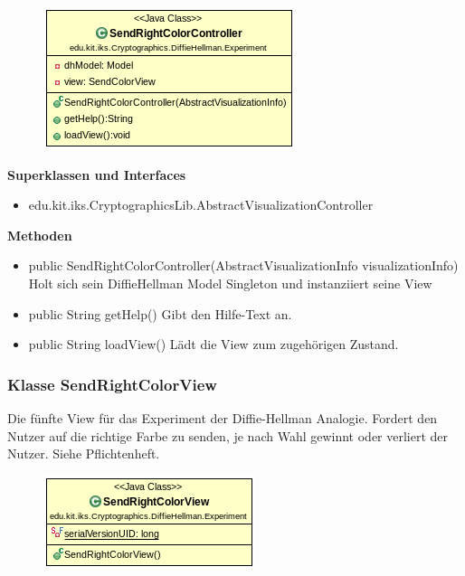 \documentclass{article}
\begin{document}
      \begin{figure}[H]
        \centering
        \includegraphics{resources/edu-kit-iks-Cryptographics-DiffieHellman-Experiment-SendRightColorController}
      \end{figure}

      \textbf{Superklassen und Interfaces}
      \begin{itemize}
        \item edu.kit.iks.CryptographicsLib.AbstractVisualizationController
      \end{itemize}

      \textbf{Methoden}
      \begin{itemize}
          \item public SendRightColorController(AbstractVisualizationInfo visualizationInfo) \newline
              Holt sich sein DiffieHellman Model Singleton und instanziiert seine View
        \item public String getHelp() \newline
        Gibt den Hilfe-Text an.
        \item public String loadView() \newline
        Lädt die View zum zugehörigen Zustand.
      \end{itemize}

\subsubsection{Klasse SendRightColorView}
      Die fünfte View für das Experiment der Diffie-Hellman Analogie.
      Fordert den Nutzer auf die richtige Farbe zu senden,
      je nach Wahl gewinnt oder verliert der Nutzer. Siehe Pflichtenheft.

      \begin{figure}[H]
        \centering
        \includegraphics{resources/edu-kit-iks-Cryptographics-DiffieHellman-Experiment-SendRightColorView}
      \end{figure}
\end{document}
